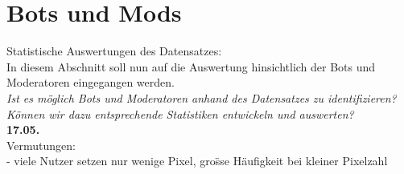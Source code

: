 \section{Bots und Mods} \label{question2} %

Statistische Auswertungen des Datensatzes:\\
In diesem Abschnitt soll nun auf die Auswertung hinsichtlich der Bots und Moderatoren eingegangen werden. \\
\textit{Ist es m{\"o}glich Bots und Moderatoren anhand des Datensatzes zu identifizieren?}\\
\textit{K{\"o}nnen wir dazu entsprechende Statistiken entwickeln und auswerten?}\\
\textbf{17.05.}\\
Vermutungen:\\
- viele Nutzer setzen nur wenige Pixel, gro{\"ss}e H{\"a}ufigkeit bei kleiner Pixelzahl\\
